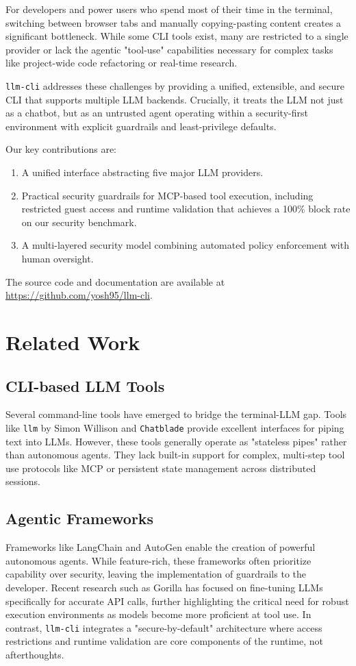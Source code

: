 \documentclass[conference]{IEEEtran}
\begin{document}
For developers and power users who spend most of their time in the terminal, switching between browser tabs and manually copying-pasting content creates a significant bottleneck. While some CLI tools exist, many are restricted to a single provider or lack the agentic "tool-use" capabilities necessary for complex tasks like project-wide code refactoring or real-time research.

\texttt{llm-cli} addresses these challenges by providing a unified, extensible, and secure CLI that supports multiple LLM backends. Crucially, it treats the LLM not just as a chatbot, but as an untrusted agent operating within a security-first environment with explicit guardrails and least-privilege defaults.

Our key contributions are:
\begin{enumerate}
    \item A unified interface abstracting five major LLM providers.
    \item Practical security guardrails for MCP-based tool execution, including restricted guest access and runtime validation that achieves a 100\% block rate on our security benchmark.
    \item A multi-layered security model combining automated policy enforcement with human oversight.
\end{enumerate}

The source code and documentation are available at \url{https://github.com/yosh95/llm-cli}.

\section{Related Work}

\subsection{CLI-based LLM Tools}
Several command-line tools have emerged to bridge the terminal-LLM gap. Tools like \texttt{llm} by Simon Willison and \texttt{Chatblade} provide excellent interfaces for piping text into LLMs. However, these tools generally operate as "stateless pipes" rather than autonomous agents. They lack built-in support for complex, multi-step tool use protocols like MCP or persistent state management across distributed sessions.

\subsection{Agentic Frameworks}
Frameworks like LangChain \cite{langchain} and AutoGen \cite{autogen} enable the creation of powerful autonomous agents. While feature-rich, these frameworks often prioritize capability over security, leaving the implementation of guardrails to the developer. Recent research such as Gorilla \cite{gorilla} has focused on fine-tuning LLMs specifically for accurate API calls, further highlighting the critical need for robust execution environments as models become more proficient at tool use. In contrast, \texttt{llm-cli} integrates a "secure-by-default" architecture where access restrictions and runtime validation are core components of the runtime, not afterthoughts.
\end{document}
